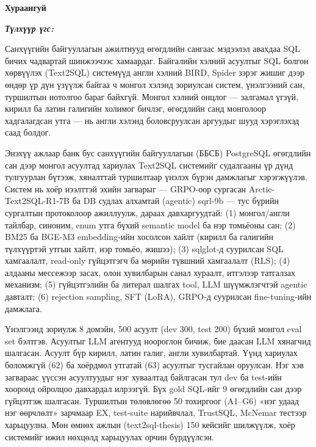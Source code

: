 

\begin{center}
{\scshape\Large \univname\par}
{\scshape\large \facname\par}\vspace{0.5cm}
{\huge\textbf{{Хураангуй}} \par}
\bigskip
{\Large{\ttitle} \par}
\bigskip

{\normalsize \shortname \par}
\addressname
\end{center}

\textit{\textbf{Түлхүүр үгс: \keywordnames}}
\bigskip

Санхүүгийн байгууллагын ажилтнууд өгөгдлийн сангаас мэдээлэл авахдаа SQL бичих чадвартай шинжээчээс хамаардаг.
Байгалийн хэлний асуултыг SQL болгон хөрвүүлэх (Text2SQL) системүүд англи хэлний BIRD, Spider зэрэг жишиг дээр
өндөр үр дүн үзүүлж байгаа ч монгол хэлэнд зориулсан систем, үнэлгээний сан, туршилтын нотолгоо бараг байхгүй.
Монгол хэлний онцлог --- залгамал үгзүй, кирилл ба латин галигийн холимог бичлэг, өгөгдлийн санд монголоор
хадгалагдсан утга --- нь англи хэлэнд боловсруулсан аргуудыг шууд хэрэглэхэд саад болдог.

Энэхүү ажлаар банк бус санхүүгийн байгууллагын (ББСБ) PostgreSQL өгөгдлийн сан дээр монгол асуултад хариулах
Text2SQL системийг судалгааны үр дүнд тулгуурлан бүтээж, хяналттай туршилтаар үнэлэх бүрэн дамжлагыг
хэрэгжүүлэв. Систем нь хоёр нээлттэй эхийн загварыг --- GRPO-оор сургасан Arctic-Text2SQL-R1-7B ба DB судлах алхамтай
(agentic) sqrl-9b --- тус бүрийн сургалтын протоколоор ажиллуулж, дараах давхаргуудтай:
(1) монгол/англи тайлбар, синоним, enum утга бүхий semantic model ба нэр томьёоны сан;
(2) BM25 ба BGE-M3 embedding-ийн хосолсон хайлт (кирилл ба галигийн түлхүүртэй утгын хайлт, нэр томьёо, жишээ);
(3) sqlglot-д суурилсан SQL хамгаалалт, read-only гүйцэтгэгч ба мөрийн түвшний хамгаалалт (RLS);
(4) алдааны мессежээр засах, олон хувилбарын санал хураалт, итгэлээр татгалзах механизм;
(5) гүйцэтгэлийн ба литерал шалгах tool, LLM шүүмжлэгчтэй agentic давталт;
(6) rejection sampling, SFT (LoRA), GRPO-д суурилсан fine-tuning-ийн дамжлага.

Үнэлгээнд зориулж 8 домэйн, 500 асуулт (dev 300, test 200) бүхий монгол eval set бэлтгэв. Асуултыг LLM агентууд
ноороглон бичиж, бие даасан LLM хянагчид шалгасан. Асуулт бүр кирилл, латин галиг, англи хувилбартай. Үүнд хариулах
боломжгүй (62) ба хоёрдмол утгатай (63) асуултыг тусгайлан оруулсан. Нэг хэв загвараас үүссэн асуултуудыг нэг
хуваалтад байлгасан тул dev ба test-ийн хооронд ойролцоо давхардал илрээгүй. Бүх gold SQL-ийг 9 өгөгдлийн сан
дээр гүйцэтгэж шалгасан. Туршилтын төлөвлөгөө 50 тохиргоог (A1--G6) «нэг
удаад нэг өөрчлөлт» зарчмаар EX, test-suite нарийвчлал, TrustSQL, McNemar тестээр харьцуулна. Мөн өмнөх ажлын
(text2sql-thesis) 150 кейсийг шилжүүлж, хоёр системийг ижил нөхцөлд харьцуулах орчин бүрдүүлсэн.


